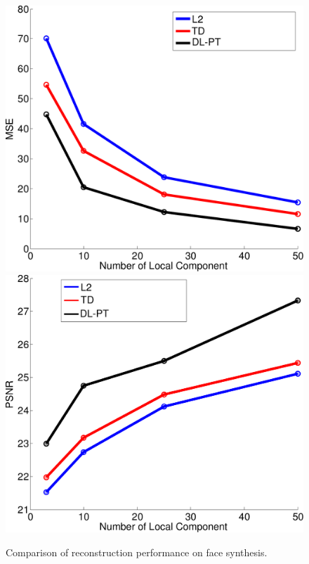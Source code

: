 \begin{figure}
    \centering
    \includegraphics[height=0.4\columnwidth]{figs/f3_mse.pdf}
    \includegraphics[height=0.4\columnwidth]{figs/f3_psnr.pdf}
    \caption{Comparison of reconstruction performance on face synthesis.}
    \label{fig:face_syn}
\end{figure}

